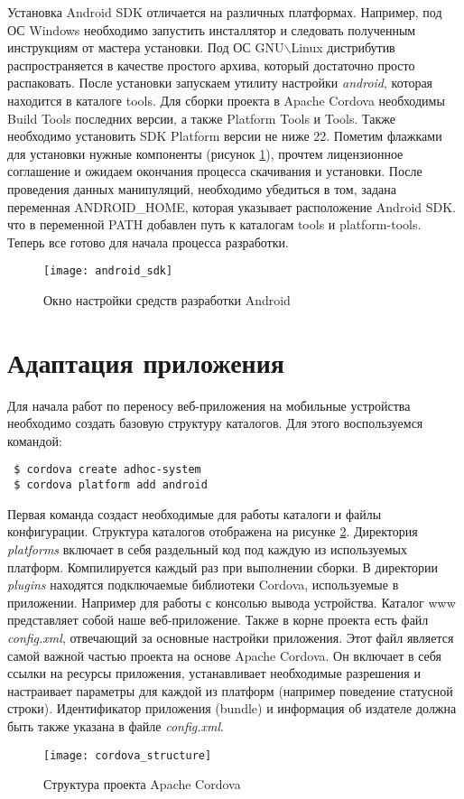 Установка Android SDK отличается на различных платформах. Например, под ОС Windows необходимо запустить инсталлятор и следовать полученным инструкциям от мастера установки. Под ОС GNU$\backslash$Linux дистрибутив распространяется в качестве простого архива, который достаточно просто распаковать. После установки запускаем утилиту настройки \textit{android}, которая находится в каталоге tools. Для сборки проекта в Apache Cordova необходимы Build Tools последних версии, а также Platform Tools и Tools. Также необходимо установить SDK Platform версии не ниже 22. Пометим флажками для установки нужные компоненты (рисунок \ref{android_sdk}), прочтем лицензионное соглашение и ожидаем окончания процесса скачивания и установки. После проведения данных манипуляций, необходимо убедиться в том, задана переменная ANDROID\_HOME, которая указывает расположение Android SDK. что в переменной PATH добавлен путь к каталогам tools и platform-tools. Теперь все готово для начала процесса разработки.
\begin{figure}[ht]
\center\texttt{[image: android\_sdk]}
\caption{Окно настройки средств разработки Android}\label{android_sdk}
\end{figure}

\section{Адаптация приложения}
Для начала работ по переносу веб-приложения на мобильные устройства необходимо создать базовую структуру каталогов. Для этого воспользуемся командой:
\begin{lstlisting}
 $ cordova create adhoc-system
 $ cordova platform add android
\end{lstlisting}

Первая команда создаст необходимые для работы каталоги и файлы конфигурации. Структура каталогов отображена на рисунке \ref{cordova_structure}. Директория \textit{platforms} включает в себя раздельный код под каждую из используемых платформ. Компилируется каждый раз при выполнении сборки. В директории \textit{plugins} находятся подключаемые библиотеки Cordova, используемые в приложении. Например для работы с консолью вывода устройства. Каталог www представляет собой наше веб-приложение. Также в корне проекта есть файл \textit{config.xml}, отвечающий за основные настройки приложения. Этот файл является самой важной частью проекта на основе Apache Cordova. Он включает в себя ссылки на ресурсы приложения, устанавливает необходимые разрешения и настраивает параметры для каждой из платформ (например поведение статусной строки). Идентификатор приложения (bundle) и информация об издателе должна быть также указана в файле \textit{config.xml}.
\begin{figure}[ht]
\center\texttt{[image: cordova\_structure]}
\caption{Структура проекта Apache Cordova}\label{cordova_structure}
\end{figure}

